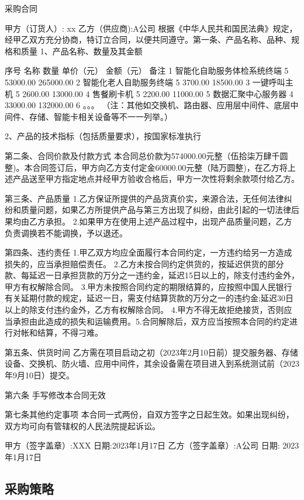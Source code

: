 \documentclass[UTF8]{../computerUniverse}
\begin{document}
采购合同

甲方（订货人）: xx
乙方（供应商):A公司
根据《中华人民共和国民法典》规定，经甲乙双方充分协商，特订立合同，以便共同遵守。第一条、产品名称、品种、规格和质量
1、产品名称、数量及其金额

序号    名称                            数量    单价（元）  金额（元）  备注
1       智能化自助服务体检系统终端      5       53000.00    265000.00 
2       智能化老人自助服务终端          5       3700.00     18500.00  
3       一键呼叫主机                5       2600.00     13000.00    
4       售餐刷卡机                  5       2200.00     11000.00        
5       数据汇聚中心服务器          4       33000.00    132000.00
6       。。。
（注：其他如交换机、路由器、应用层中间件、底层中间件、存储、智能卡相关设备等不一一列举。）

2、产品的技术指标（包括质量要求），按国家标准执行


第二条、合同价款及付款方式
本合同总价款为574000.00元整（伍拾柒万肆千圆整)。本合同签订后，甲方向乙方支付定金60000.00元整（陆万圆整)，在乙方将上述产品送至甲方指定地点并经甲方验收合格后，甲方一次性将剩余款项付给乙方。

第三条、产品质量
1.乙方保证所提供的产品货真价实，来源合法，无任何法律纠纷和质量问题，如果乙方所提供产品与第三方出现了纠纷，由此引起的一切法律后果均由乙方承担。
2.如果甲方在使用上述产品过程中，出现产品质量问题，乙方负责调换若不能调换，予以退还。

第四条、违约责任
1.甲乙双方均应全面履行本合同约定，一方违约给另一方造成损失的，应当承担赔偿责任。
2.乙方未按合同约定供货的，按延迟供货的部分款、每延迟一日承担货款的万分之一违约金，延迟15日以上的，除支付违约金外，甲方有权解除合同。
3.甲方未按照合同约定的期限结算的，应按照中国人民银行有关延期付款的规定，延迟一日，需支付结算货款的万分之一的违约金;延迟30日以上的除支付违约金外，乙方有权解除合同。
4.甲方不得无故拒绝接货，否则应当承担由此造成的损失和运输费用。5.合同解除后，双方应当按照本合同的约定进行对帐和结算，不得刁难。

第五条、供货时间
乙方需在项目启动之初（2023年2月10日前）提交服务器、存储设备、交换机、防火墙、应用中间件，其余设备需在项目进入到系统测试前（2023年9月10日）提交。

第六条 手写修改本合同无效

第七条其他约定事项
本合同一式两份，自双方签字之日起生效。如果出现纠纷，双方均可向有管辖权的人民法院提起诉讼。


甲方（签字盖章）:XXX 日期:2023年1月17日
乙方（签字盖章）:A公司 日期: 2023年1月17日


\subsection{采购策略}
\end{document}
